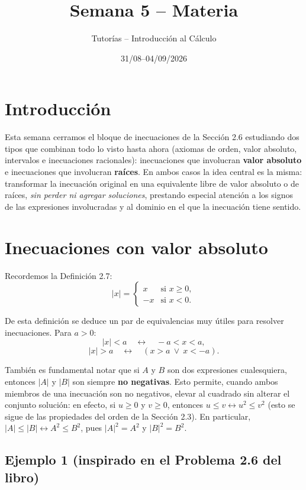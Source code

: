 \documentclass[11pt]{article}
\title{Semana 5 -- Materia}
\author{Tutorías -- Introducción al Cálculo}
\date{31/08--04/09/2026}
\begin{document}
\maketitle

\section*{Introducción}

Esta semana cerramos el bloque de inecuaciones de la Sección 2.6 estudiando dos tipos que combinan
todo lo visto hasta ahora (axiomas de orden, valor absoluto, intervalos e inecuaciones racionales):
inecuaciones que involucran \textbf{valor absoluto} e inecuaciones que involucran \textbf{raíces}.
En ambos casos la idea central es la misma: transformar la inecuación original en una equivalente
libre de valor absoluto o de raíces, \emph{sin perder ni agregar soluciones}, prestando especial
atención a los signos de las expresiones involucradas y al dominio en el que la inecuación tiene
sentido.

\section{Inecuaciones con valor absoluto}

Recordemos la Definición 2.7:
\[
|x| = \begin{cases} x & \text{si } x \ge 0, \\ -x & \text{si } x < 0. \end{cases}
\]

De esta definición se deduce un par de equivalencias muy útiles para resolver inecuaciones. Para
$a > 0$:
\[
|x| < a \quad \leftrightarrow \quad -a < x < a,
\]
\[
|x| > a \quad \leftrightarrow \quad (x > a \ \lor\ x < -a).
\]

También es fundamental notar que si $A$ y $B$ son dos expresiones cualesquiera, entonces $|A|$ y
$|B|$ son siempre \textbf{no negativas}. Esto permite, cuando ambos miembros de una inecuación son
no negativos, elevar al cuadrado sin alterar el conjunto solución: en efecto, si $u \ge 0$ y
$v \ge 0$, entonces $u \le v \leftrightarrow u^2 \le v^2$ (esto se sigue de las propiedades del
orden de la Sección 2.3). En particular, $|A| \le |B| \leftrightarrow A^2 \le B^2$, pues
$|A|^2 = A^2$ y $|B|^2 = B^2$.

\subsection*{Ejemplo 1 (inspirado en el Problema 2.6 del libro)}
\end{document}
